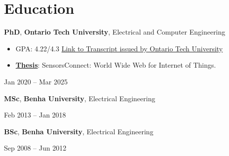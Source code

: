 \documentclass[10pt, letterpaper]{article}
\newenvironment{highlights}{
    \begin{itemize}[
        topsep=0.10 cm,
        parsep=0.10 cm,
        partopsep=0pt,
        itemsep=0pt,
        leftmargin=0.4 cm + 10pt
    ]
}{
    \end{itemize}
} %
\newenvironment{twocolentry}[2][]{
    \onecolentry
    \def\secondColumn{#2}
    \begin{minipage}[t]{\dimexpr\linewidth-4.7cm\relax}
}{
    \end{minipage}\hfill%
    \begin{minipage}[t]{4.5cm}
        \raggedleft\secondColumn
    \end{minipage}
    \endonecolentry
} %
\let\hrefWithoutArrow\href
\renewcommand{\href}[2]{\hrefWithoutArrow{#1}{#2}}
\begin{document}

  

\vspace{-0.3cm}
    \section{Education}



        
        \begin{twocolentry}{
            Jan 2020 – Mar 2025
        }
            \textbf{PhD}, \textbf{Ontario Tech University}, Electrical and Computer Engineering
            \begin{highlights}
                \item GPA: 4.22/4.3 \href{https://learner.mycreds.ca/sharelink/f677e6e2-700e-4b53-a439-30bacbe9bde9/56c2684a-c6e8-480c-9fa4-93d6d649d3fe}{Link to Transcript issued by Ontario Tech University}
                \item \textbf{\href{https://ontariotechu.scholaris.ca/items/ae8fb02b-3cff-4738-aa4b-96834b35dc54/full}{Thesis}}: SensorsConnect: World Wide Web for Internet of Things.
            \end{highlights}
        \end{twocolentry}

\begin{twocolentry}{
           Feb 2013 – Jan 2018
        }
            \textbf{MSc}, \textbf{Benha University}, Electrical Engineering
        \end{twocolentry}


\begin{twocolentry}{
            Sep  2008 – Jun 2012
        }
             \textbf{BSc}, \textbf{Benha University}, Electrical Engineering
        \end{twocolentry}



    
    



        
\end{document}
